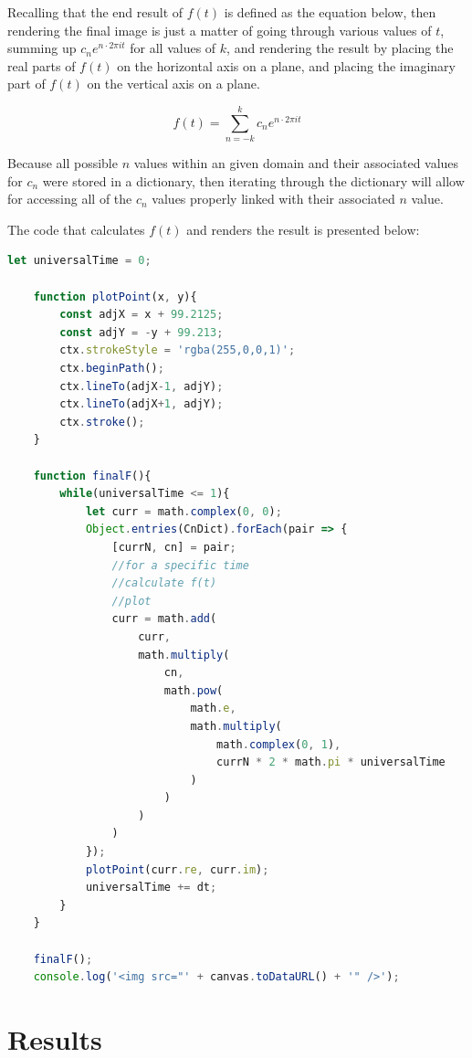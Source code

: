 \documentclass[letterpaper, 12pt]{article}
\begin{document}
Recalling that the end result of \(f(t)\) is defined as the equation
below, then rendering the final image is just a matter of going
through various values of \(t\), summing up \(c_n e^{n \cdot 2\pi it}\)
for all values of \(k\), and rendering the result by placing
the real parts of \(f(t)\) on the horizontal axis on a plane,
and placing the imaginary part of \(f(t)\) on the vertical axis
on a plane.

\begin{equation*}
    f(t) = \sum_{n=-k}^{k} c_n e^{n \cdot 2\pi it}
\end{equation*}

Because all possible \(n\) values within an given domain and
their associated values for \(c_n\) were stored in a dictionary,
then iterating through the dictionary will allow for accessing
all of the \(c_n\) values properly linked with their associated \(n\) value.

The code that calculates \(f(t)\) and renders the result is presented below:
\begin{lstlisting}[language=JavaScript]
    let universalTime = 0;

    function plotPoint(x, y){
        const adjX = x + 99.2125;
        const adjY = -y + 99.213;
        ctx.strokeStyle = 'rgba(255,0,0,1)';
        ctx.beginPath();
        ctx.lineTo(adjX-1, adjY);
        ctx.lineTo(adjX+1, adjY);
        ctx.stroke();
    }

    function finalF(){
        while(universalTime <= 1){
            let curr = math.complex(0, 0);
            Object.entries(CnDict).forEach(pair => {
                [currN, cn] = pair;
                //for a specific time
                //calculate f(t)
                //plot
                curr = math.add(
                    curr,
                    math.multiply(
                        cn,
                        math.pow(
                            math.e,
                            math.multiply(
                                math.complex(0, 1),
                                currN * 2 * math.pi * universalTime
                            )
                        )
                    )
                )
            });
            plotPoint(curr.re, curr.im);
            universalTime += dt;
        }
    }

    finalF();
    console.log('<img src="' + canvas.toDataURL() + '" />');
\end{lstlisting}

\section{Results}
\end{document}
